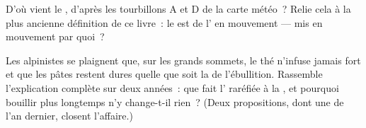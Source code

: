 \begin{exercise}[$\star\star$]\label{exo:g5:air-pressure-weather:10}
D'où vient le , d'après les tourbillons A et D de la carte
météo~? Relie cela à la plus ancienne définition de ce livre~: le
 est de l' en mouvement --- mis en mouvement par quoi~?
\end{exercise}

\begin{exercise}[$\star\star$]\label{exo:g5:air-pressure-weather:11}
Les alpinistes se plaignent que, sur les grands sommets, le thé
n'infuse jamais fort et que les pâtes restent dures quelle que soit
la  de l'ébullition. Rassemble l'explication complète sur deux
années~: que fait l' raréfiée à la , et pourquoi bouillir plus longtemps n'y change-t-il
rien~? (Deux propositions, dont une de l'an dernier, closent
l'affaire.)
\end{exercise}
